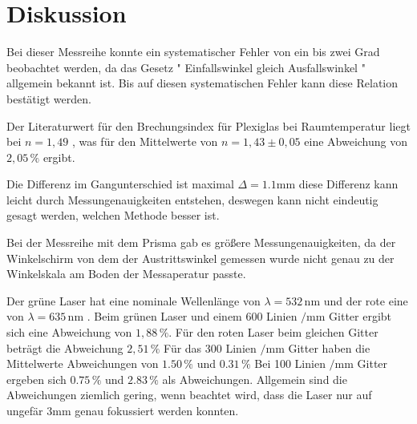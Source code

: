 \section{Diskussion}
\label{sec:Diskussion}

Bei dieser Messreihe konnte ein systematischer Fehler von ein bis zwei Grad beobachtet werden, da das Gesetz " Einfallswinkel gleich Ausfallswinkel " allgemein bekannt ist.
Bis auf diesen systematischen Fehler kann diese Relation bestätigt werden.

Der Literaturwert für den Brechungsindex für Plexiglas bei Raumtemperatur liegt bei $n =  1,49 $ \cite{ap03} , was für den Mittelwerte von $ n = 1,43 \pm 0,05 $ eine Abweichung von $2,05 \, \% $ ergibt.

Die Differenz im Gangunterschied ist maximal $\varDelta  = 1.1 \unit{\milli\meter}$ diese Differenz kann leicht durch Messungenauigkeiten entstehen, deswegen kann nicht eindeutig gesagt werden, welchen Methode besser ist.

Bei der Messreihe mit dem Prisma gab es größere Messungenauigkeiten, da der Winkelschirm von dem der Austrittswinkel gemessen wurde nicht genau zu der Winkelskala am Boden der Messaperatur passte.

Der grüne Laser hat eine nominale Wellenlänge von $ \lambda = 532 \, \unit{\nano\meter}$ und der rote eine von $ \lambda = 635  \, \unit{\nano\meter}$ \cite{ap02}.
Beim grünen Laser und einem 600 Linien $\mathbin{/} \unit{\milli\meter}$ Gitter ergibt sich eine Abweichung von $ 1,88 \, \% $. Für den roten Laser beim gleichen Gitter beträgt die Abweichung $ 2,51 \, \% $
Für das 300 Linien $\mathbin{/} \unit{\milli\meter}$ Gitter haben die Mittelwerte Abweichungen von $ 1.50 \, \% $ und  $ 0.31 \, \% $
Bei 100 Linien $\mathbin{/} \unit{\milli\meter}$ Gitter ergeben sich $ 0.75 \, \% $ und $ 2.83 \, \% $ als Abweichungen. Allgemein sind die Abweichungen ziemlich gering, wenn beachtet wird, dass die Laser nur auf ungefär $3 \unit{\milli\meter} $ genau fokussiert werden konnten. 